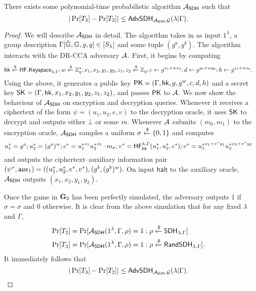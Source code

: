 \begin{lemma}
	\label{lem:sdh-game}
	There exists some polynomial-time probabilistic algorithm $\mathcal{A}_\mathsf{SDH}$ such that $$|\Pr[T_3]-\Pr[T_2]|\leq\mathsf{AdvSDH}_{\mathcal{A}_\mathsf{SDH}, \mathcal{G}}(\lambda|\Gamma).$$
\end{lemma}
\begin{proof}
	We will describe $\mathcal{A}_\mathsf{SDH}$ in detail. The algorithm takes in as input $1^\lambda$, a group description $\Gamma[\hat{\mathbb{G}},\mathbb{G},g,q]\in[S_\lambda]$ and some tuple $(g^a, g^{b})$. The algorithm interacts with the DR-CCA adversary $\mathcal{A}$. First, it begins by computing
	$$\mathsf{hk}\xleftarrow{\$}\mathsf{HF.Keyspace}_{\lambda, \Gamma}; w\xleftarrow{\$}\mathbb{Z}^{*}_q; x_1,x_2,y_1,y_2,z_1,z_2\xleftarrow{\$}\mathbb{Z}_q; c\gets g^{x_1+wx_2}; d\gets g^{y_1+wy_2}; h\gets g^{z_1+wz_2}.$$
	Using the above, it generates a public key $\mathsf{PK} = (\Gamma, \mathsf{hk}, g,g^w, c, d, h)$ and a secret key $\mathsf{SK} = (\Gamma,\mathsf{hk},x_1,x_2,y_1,y_2,z_1,z_2)$, and passes $\mathsf{PK}$ to $\mathcal{A}$. We now show the behaviour of $\mathcal{A}_\mathsf{SDH}$ on encryption and decryption queries. Whenever it receives a ciphertext of the form $\psi = (u_1,u_2,e,v)$ to the decryption oracle, it uses $\mathsf{SK}$ to decrypt and outputs either $\bot$ or some $m$. Whenever $\mathcal{A}$ submits $(m_0,m_1)$ to the encryption oracle, $\mathcal{A}_\mathsf{SDH}$ samples a uniform $\sigma\xleftarrow{\$}\{0,1\}$ and computes
	$$u_1^{*} = g^a; u_2^{*} = (g^a)^w; e^{*} = {u_1^{*}}^{z_1}{u_2^{*}}^{z_2}\cdot m_\sigma; v^{*} =\mathsf{HF}_{\mathsf{hk}}^{\lambda,\Gamma}(u_1^{*},u_2^{*},e^{*}); v^{*} = {u_1^{*}}^{x_1+v^{*}y_1}{u_2^{*}}^{x_2+v^{*}y_2}$$ and outputs the ciphertext--auxiliary information pair $(\psi^{*},\mathsf{aux}_1) = ((u_1^{*},u_2^{*},e^{*},v^{*}), (g^{b}, (g^{b})^w).$ On input $\mathsf{halt}$ to the auxiliary oracle, $\mathcal{A}_\mathsf{SDH}$ outputs $(x_1,x_2,y_1,y_2)$.
	
	Once the game in $\mathbf{G}_2$ has been perfectly simulated, the adversary outputs $1$ if $\hat{\sigma} = \sigma$ and $0$ otherwise. It is clear from the above simulation that for any fixed $\lambda$ and $\Gamma$, 
	\begin{align*}
		\Pr[T_2] &= \Pr[\mathcal{A}_\mathsf{SDH}(1^\lambda,\Gamma,\rho) = 1 : \rho\xleftarrow{\$}\mathsf{SDH}_{\lambda,\Gamma}]\\
		\Pr[T_3] &= \Pr[\mathcal{A}_\mathsf{SDH}(1^\lambda,\Gamma,\rho) = 1 : \rho\xleftarrow{\$}\mathsf{RandSDH}_{\lambda,\Gamma}].
	\end{align*}
	It immediately follows that 
	$$|\Pr[T_3]-\Pr[T_2]|\leq\mathsf{AdvSDH}_{\mathcal{A}_\mathsf{SDH}, \mathcal{G}}(\lambda|\Gamma).$$
\end{proof}

